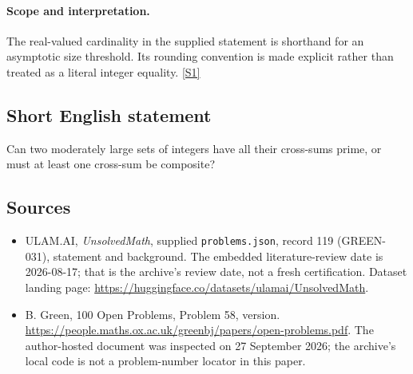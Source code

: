 \documentclass[11pt,a4paper]{article}
\newcommand{\sref}[2]{\hyperlink{source:#1:#2}{[S#2]}}
\begin{document}
\paragraph{Scope and interpretation.}

The real-valued cardinality in the supplied statement is shorthand for an asymptotic size threshold. Its rounding convention is made explicit rather than treated as a literal integer equality. \sref{119}{1}

\subsection{Short English statement}

Can two moderately large sets of integers have all their cross-sums prime, or must at least one cross-sum be composite?

\subsection{Sources}

{\small

\begin{itemize}

\item[\hypertarget{source:119:1}{S1}] ULAM.AI, \emph{UnsolvedMath}, supplied \texttt{problems.json}, record 119 (GREEN-031), statement and background. The embedded literature-review date is 2026-08-17; that is the archive’s review date, not a fresh certification. Dataset landing page: \url{https://huggingface.co/datasets/ulamai/UnsolvedMath}.

\item[\hypertarget{source:119:2}{S2}] B. Green, 100 Open Problems, Problem 58, version. \url{https://people.maths.ox.ac.uk/greenbj/papers/open-problems.pdf}. The author-hosted document was inspected on 27 September 2026; the archive’s local code is not a problem-number locator in this paper.

\end{itemize}

}

\label{end:119}
\end{document}
